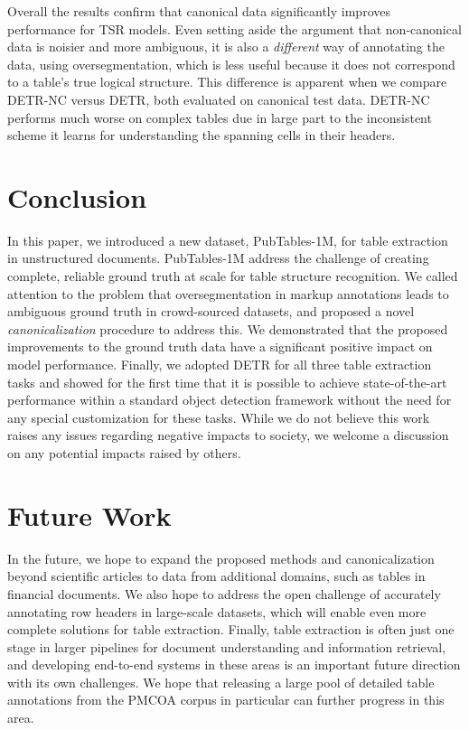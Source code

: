 \documentclass[10pt,twocolumn,letterpaper]{article}
\begin{document}
Overall the results confirm that canonical data significantly improves performance for TSR models.
Even setting aside the argument that non-canonical data is noisier and more ambiguous, it is also a \emph{different} way of annotating the data, using oversegmentation, which is less useful because it does not correspond to a table's true logical structure.
This difference is apparent when we compare DETR-NC versus DETR, both evaluated on canonical test data.
DETR-NC performs much worse on complex tables due in large part to the inconsistent scheme it learns for understanding the spanning cells in their headers.

\section{Conclusion}

In this paper, we introduced a new dataset, PubTables-1M, for table extraction in unstructured documents.
PubTables-1M address the challenge of creating complete, reliable ground truth at scale for table structure recognition.
We called attention to the problem that oversegmentation in markup annotations leads to ambiguous ground truth in crowd-sourced datasets, and proposed a novel \emph{canonicalization} procedure to address this.
We demonstrated that the proposed improvements to the ground truth data have a significant positive impact on model performance.
Finally, we adopted DETR for all three table extraction tasks and showed for the first time that it is possible to achieve state-of-the-art performance within a  standard object detection framework without the need for any special customization for these tasks.
While we do not believe this work raises any issues regarding negative impacts to society, we welcome a discussion on any potential impacts raised by others.

\section{Future Work}

In the future, we hope to expand the proposed methods and canonicalization beyond scientific articles to data from additional domains, such as tables in financial documents.
We also hope to address the open challenge of accurately annotating row headers in large-scale datasets, which will enable even more complete solutions for table extraction.
Finally, table extraction is often just one stage in larger pipelines for document understanding and information retrieval, and developing end-to-end systems in these areas is an important future direction with its own challenges.
We hope that releasing a large pool of detailed table annotations from the PMCOA corpus in particular can further progress in this area.
\end{document}
